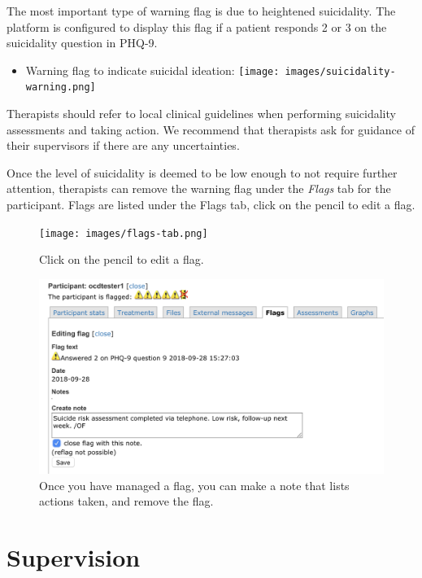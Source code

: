 \documentclass[]{book}
\providecommand{\tightlist}{%
  \setlength{\itemsep}{0pt}\setlength{\parskip}{0pt}}
\theoremstyle{definition}
\theoremstyle{definition}
\theoremstyle{definition}
\theoremstyle{remark}
\begin{document}
The most important type of warning flag is due to heightened
suicidality. The platform is configured to display this flag if a
patient responds 2 or 3 on the suicidality question in PHQ-9.

\begin{itemize}
\tightlist
\item
  Warning flag to indicate suicidal ideation:
  \texttt{[image: images/suicidality-warning.png]}
\end{itemize}

Therapists should refer to local clinical guidelines when performing
suicidality assessments and taking action. We recommend that therapists
ask for guidance of their supervisors if there are any uncertainties.

Once the level of suicidality is deemed to be low enough to not require
further attention, therapists can remove the warning flag under the
\emph{Flags} tab for the participant. Flags are listed under the Flags
tab, click on the pencil to edit a flag.

\begin{figure}
\centering
\texttt{[image: images/flags-tab.png]}
\caption{Click on the pencil to edit a flag.}
\end{figure}

\begin{figure}
\centering
\includegraphics{images/remove-flag.png}
\caption{Once you have managed a flag, you can make a note that lists
actions taken, and remove the flag.}
\end{figure}

\hypertarget{supervision}{%
\section{Supervision}\label{supervision}}
\end{document}
